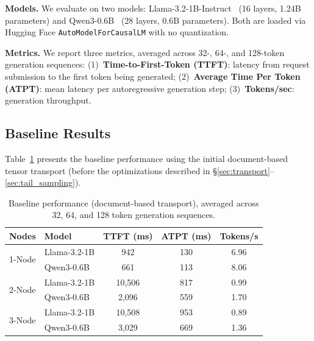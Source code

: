 \documentclass[runningheads]{llncs}
\begin{document}
\noindent\textbf{Models.} We evaluate on two models: Llama-3.2-1B-Instruct~\cite{grattafiori2024llama} (16 layers, 1.24B parameters) and Qwen3-0.6B~\cite{yang2025qwen3} (28 layers, 0.6B parameters). Both are loaded via Hugging Face \texttt{AutoModelForCausalLM} with no quantization.

\noindent\textbf{Metrics.} We report three metrics, averaged across 32-, 64-, and 128-token generation sequences: (1)~\textbf{Time-to-First-Token (TTFT)}: latency from request submission to the first token being generated; (2)~\textbf{Average Time Per Token (ATPT)}: mean latency per autoregressive generation step; (3)~\textbf{Tokens/sec}: generation throughput.

\subsection{Baseline Results}
\label{sec:baseline_results}

Table~\ref{tab:baseline} presents the baseline performance using the initial document-based tensor transport (before the optimizations described in \S\ref{sec:transport}--\ref{sec:tail_sampling}).

\begin{table}[t]
    \centering
    \caption{Baseline performance (document-based transport), averaged across 32, 64, and 128 token generation sequences.}
    \label{tab:baseline}
    \begin{tabular}{llccc}
    \toprule
    \textbf{Nodes} & \textbf{Model} & \textbf{TTFT (ms)} & \textbf{ATPT (ms)} & \textbf{Tokens/s} \\
    \midrule
    \multirow{2}{*}{1-Node} & Llama-3.2-1B & 942 & 130 & 6.96 \\
    & Qwen3-0.6B & 661 & 113 & 8.06 \\
    \midrule
    \multirow{2}{*}{2-Node} & Llama-3.2-1B & 10{,}506 & 817 & 0.99 \\
    & Qwen3-0.6B & 2{,}096 & 559 & 1.70 \\
    \midrule
    \multirow{2}{*}{3-Node} & Llama-3.2-1B & 10{,}508 & 953 & 0.89 \\
    & Qwen3-0.6B & 3{,}029 & 669 & 1.36 \\
    \bottomrule
    \end{tabular}
\end{table}
\end{document}
